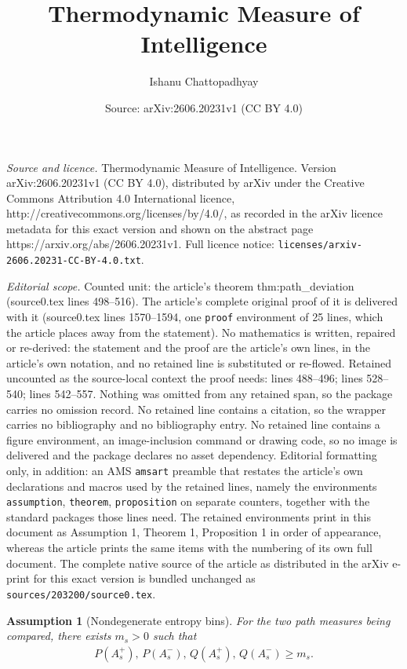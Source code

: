 \documentclass[10pt,a4paper]{amsart}
\title{Thermodynamic Measure of Intelligence}
\author{Ishanu Chattopadhyay}
\date{Source: arXiv:2606.20231v1 (CC BY 4.0)}
\newtheorem{assumption}{Assumption}
\def\EQSP{3pt}
\newcommand{\cgather}[2][\EQSP]{\begingroup\setlength\abovedisplayskip{#1}\setlength\belowdisplayskip{#1}\begin{gather} #2 \end{gather}\endgroup\noindent}
\begin{document}
\maketitle

\noindent\emph{Source and licence.} Thermodynamic Measure of Intelligence. Version arXiv:2606.20231v1 (CC BY 4.0), distributed by arXiv under the Creative Commons Attribution 4.0 International licence, http://creativecommons.org/licenses/by/4.0/, as recorded in the arXiv licence metadata for this exact version and shown on the abstract page https://arxiv.org/abs/2606.20231v1. Full licence notice: \texttt{licenses/arxiv-2606.20231-CC-BY-4.0.txt}.\par\smallskip

\noindent\textit{Editorial scope.} Counted unit: the article's theorem thm:path\_deviation (source0.tex lines 498--516). The article's complete original proof of it is delivered with it (source0.tex lines 1570--1594, one \texttt{proof} environment of 25 lines, which the article places away from the statement). No mathematics is written, repaired or re-derived: the statement and the proof are the article's own lines, in the article's own notation, and no retained line is substituted or re-flowed.  Retained uncounted as the source-local context the proof needs: lines 488--496; lines 528--540; lines 542--557.  Nothing was omitted from any retained span, so the package carries no omission record.  No retained line contains a citation, so the wrapper carries no bibliography and no bibliography entry.  No retained line contains a figure environment, an image-inclusion command or drawing code, so no image is delivered and the package declares no asset dependency.  Editorial formatting only, in addition: an AMS \texttt{amsart} preamble that restates the article's own declarations and macros used by the retained lines, namely the environments \texttt{assumption}, \texttt{theorem}, \texttt{proposition} on separate counters, together with the standard packages those lines need.  The retained environments print in this document as Assumption 1, Theorem 1, Proposition 1 in order of appearance, whereas the article prints the same items with the numbering of its own full document.  The complete native source of the article as distributed in the arXiv e-print for this exact version is bundled unchanged as \texttt{sources/203200/source0.tex}.
\begin{assumption}[Nondegenerate entropy bins]
\label{ass:nondegenerate_bins}
For the two path measures being compared, there exists \(m_s>0\) such that
\cgather{
    P(A_s^+),\,P(A_s^-),\,Q(A_s^+),\,Q(A_s^-)
    \geq m_s.
    \label{eq:nondegenerate_bins}
}
\end{assumption}
\end{document}
